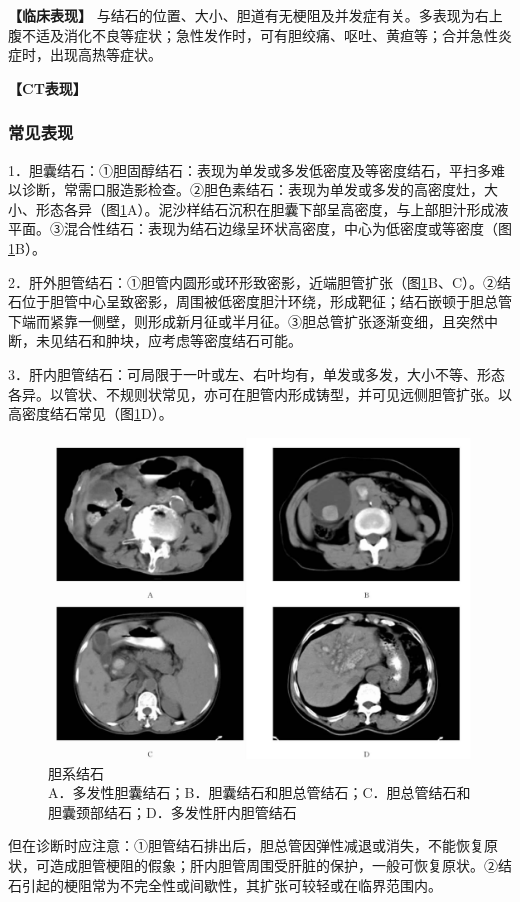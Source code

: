 \textbf{【临床表现】}
与结石的位置、大小、胆道有无梗阻及并发症有关。多表现为右上腹不适及消化不良等症状；急性发作时，可有胆绞痛、呕吐、黄疸等；合并急性炎症时，出现高热等症状。

\textbf{【CT表现】}

\subsubsection{常见表现}

1．胆囊结石：①胆固醇结石：表现为单发或多发低密度及等密度结石，平扫多难以诊断，常需口服造影检查。②胆色素结石：表现为单发或多发的高密度灶，大小、形态各异（图\ref{fig12-3}A）。泥沙样结石沉积在胆囊下部呈高密度，与上部胆汁形成液平面。③混合性结石：表现为结石边缘呈环状高密度，中心为低密度或等密度（图\ref{fig12-3}B）。

2．肝外胆管结石：①胆管内圆形或环形致密影，近端胆管扩张（图\ref{fig12-3}B、C）。②结石位于胆管中心呈致密影，周围被低密度胆汁环绕，形成靶征；结石嵌顿于胆总管下端而紧靠一侧壁，则形成新月征或半月征。③胆总管扩张逐渐变细，且突然中断，未见结石和肿块，应考虑等密度结石可能。

3．肝内胆管结石：可局限于一叶或左、右叶均有，单发或多发，大小不等、形态各异。以管状、不规则状常见，亦可在胆管内形成铸型，并可见远侧胆管扩张。以高密度结石常见（图\ref{fig12-3}D）。

\begin{figure}[!htbp]
 \centering
 \includegraphics[width=.7\textwidth,height=\textheight,keepaspectratio]{./images/Image00293.jpg}
 \captionsetup{justification=centering}
 \caption{胆系结石\\{\small A．多发性胆囊结石；B．胆囊结石和胆总管结石；C．胆总管结石和胆囊颈部结石；D．多发性肝内胆管结石}}
 \label{fig12-3}
  \end{figure} 

但在诊断时应注意：①胆管结石排出后，胆总管因弹性减退或消失，不能恢复原状，可造成胆管梗阻的假象；肝内胆管周围受肝脏的保护，一般可恢复原状。②结石引起的梗阻常为不完全性或间歇性，其扩张可较轻或在临界范围内。

